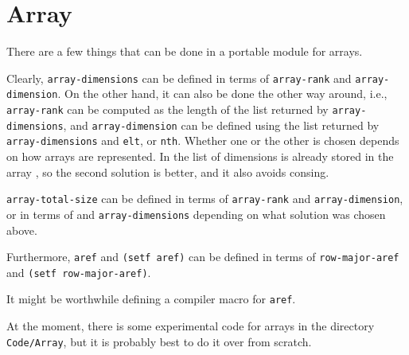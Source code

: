 \chapter{Array}
\label{chap-array}

There are a few things that can be done in a portable module for
arrays. 

Clearly, \texttt{array-dimensions} can be defined in terms of
\texttt{array-rank} and \texttt{array-dimension}.  On the other hand,
it can also be done the other way around, i.e., \texttt{array-rank}
can be computed as the length of the list returned by
\texttt{array-dimensions}, and \texttt{array-dimension} can be defined
using the list returned by \texttt{array-dimensions} and
\texttt{elt}, or \texttt{nth}.  Whether one or the other is chosen
depends on how arrays are represented.  In \sysname{} the list of
dimensions is already stored in the array
, so the second solution is
better, and it also avoids consing. 

\texttt{array-total-size} can be defined in terms of
\texttt{array-rank} and \texttt{array-dimension}, or in terms of and
\texttt{array-dimensions} depending on what solution was chosen above.

Furthermore, \texttt{aref} and
\texttt{(setf aref)} can be defined in terms of
\texttt{row-major-aref} and \texttt{(setf row-major-aref)}. 

It might be worthwhile defining a compiler macro for \texttt{aref}. 

At the moment, there is some experimental code for arrays in the
directory \texttt{Code/Array}, but it is probably best to do it over
from scratch. 

